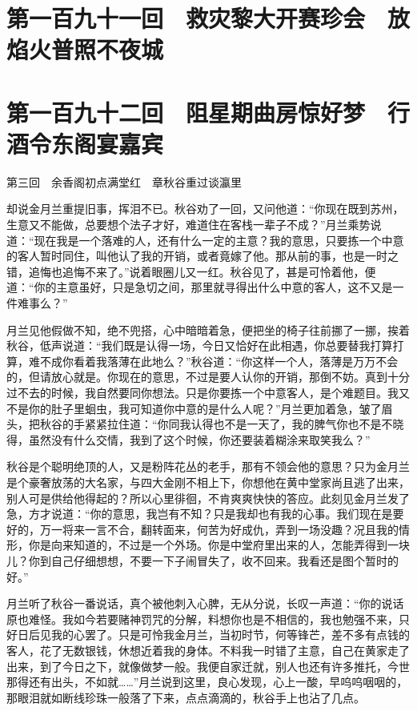 \documentclass[12pt,UTF8]{ctexbook}
\begin{document}
{{{\chapter{第一百九十一回　救灾黎大开赛珍会　放焰火普照不夜城}

\chapter{第一百九十二回　阻星期曲房惊好梦　行酒令东阁宴嘉宾}


第三回　余香阁初点满堂红　章秋谷重过谈瀛里





却说金月兰重提旧事，挥泪不已。秋谷劝了一回，又问他道：“你现在既到苏州，生意又不能做，总要想个法子才好，难道住在客栈一辈子不成？”月兰乘势说道：“现在我是一个落难的人，还有什么一定的主意？我的意思，只要拣一个中意的客人暂时同住，叫他认了我的开销，或者竟嫁了他。那从前的事，也是一时之错，追悔也追悔不来了。”说着眼圈儿又一红。秋谷见了，甚是可怜着他，便道：“你的主意虽好，只是急切之间，那里就寻得出什么中意的客人，这不又是一件难事么？”

月兰见他假做不知，绝不兜搭，心中暗暗着急，便把坐的椅子往前挪了一挪，挨着秋谷，低声说道：“我们既是认得一场，今日又恰好在此相遇，你总要替我打算打算，难不成你看着我落薄在此地么？”秋谷道：“你这样一个人，落薄是万万不会的，但请放心就是。你现在的意思，不过是要人认你的开销，那倒不妨。真到十分过不去的时候，我自然要同你想法。只是你要拣一个中意客人，是个难题目。我又不是你的肚子里蛔虫，我可知道你中意的是什么人呢？”月兰更加着急，皱了眉头，把秋谷的手紧紧拉住道：“你同我认得也不是一天了，我的脾气你也不是不晓得，虽然没有什么交情，我到了这个时候，你还要装着糊涂来取笑我么？”

秋谷是个聪明绝顶的人，又是粉阵花丛的老手，那有不领会他的意思？只为金月兰是个豪奢放荡的大名家，与四大金刚不相上下，你想他在黄中堂家尚且逃了出来，别人可是供给他得起的？所以心里徘徊，不肯爽爽快快的答应。此刻见金月兰发了急，方才说道：“你的意思，我岂有不知？只是我却也有我的心事。我们现在是要好的，万一将来一言不合，翻转面来，何苦为好成仇，弄到一场没趣？况且我的情形，你是向来知道的，不过是一个外场。你是中堂府里出来的人，怎能弄得到一块儿？你到自己仔细想想，不要一下子闹冒失了，收不回来。我看还是图个暂时的好。”

月兰听了秋谷一番说话，真个被他刺入心脾，无从分说，长叹一声道：“你的说话原也难怪。我如今若要赌神罚咒的分解，料想你也是不相信的，我也勉强不来，只好日后见我的心罢了。只是可怜我金月兰，当初时节，何等锋芒，差不多有点钱的客人，花了无数银钱，休想近着我的身体。不料我一时错了主意，自己在黄家走了出来，到了今日之下，就像做梦一般。我便自家迁就，别人也还有许多推托，今世那得还有出头，不如就……”月兰说到这里，良心发现，心上一酸，早呜呜咽咽的，那眼泪就如断线珍珠一般落了下来，点点滴滴的，秋谷手上也沾了几点。

}}}
\end{document}
